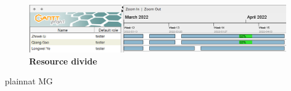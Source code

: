 \documentclass[12pt, titlepage]{article}
\begin{document}
\begin{figure}[H]
\centering
\includegraphics[width=1.0\textwidth]{./Figures/Resources.png}
\caption{\textbf{Resource divide}}
\label{FigUH}
\end{figure}

 {plainnat}
 {MG}
\end{document}
